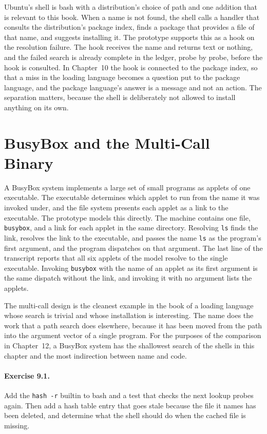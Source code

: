 \documentclass[11pt,oneside]{report}
\theoremstyle{plain}
\theoremstyle{definition}
\theoremstyle{remark}
\begin{document}
Ubuntu's shell is bash with a distribution's choice of path and one addition that is relevant to this book. When a name is not found, the shell calls a handler that consults the distribution's package index, finds a package that provides a file of that name, and suggests installing it. The prototype supports this as a hook on the resolution failure. The hook receives the name and returns text or nothing, and the failed search is already complete in the ledger, probe by probe, before the hook is consulted. In Chapter~10 the hook is connected to the package index, so that a miss in the loading language becomes a question put to the package language, and the package language's answer is a message and not an action. The separation matters, because the shell is deliberately not allowed to install anything on its own.

\section{BusyBox and the Multi-Call Binary}

A BusyBox system implements a large set of small programs as applets of one executable. The executable determines which applet to run from the name it was invoked under, and the file system presents each applet as a link to the executable. The prototype models this directly. The machine contains one file, \texttt{busybox}, and a link for each applet in the same directory. Resolving \texttt{ls} finds the link, resolves the link to the executable, and passes the name \texttt{ls} as the program's first argument, and the program dispatches on that argument. The last line of the transcript reports that all six applets of the model resolve to the single executable. Invoking \texttt{busybox} with the name of an applet as its first argument is the same dispatch without the link, and invoking it with no argument lists the applets.

The multi-call design is the cleanest example in the book of a loading language whose search is trivial and whose installation is interesting. The name does the work that a path search does elsewhere, because it has been moved from the path into the argument vector of a single program. For the purposes of the comparison in Chapter~12, a BusyBox system has the shallowest search of the shells in this chapter and the most indirection between name and code.

\paragraph{Exercise 9.1.} Add the \texttt{hash -r} builtin to bash and a test that checks the next lookup probes again. Then add a hash table entry that goes stale because the file it names has been deleted, and determine what the shell should do when the cached file is missing.
\end{document}

